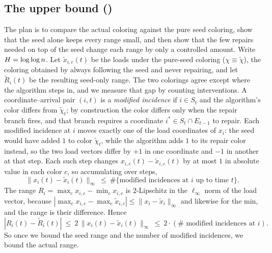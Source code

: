 \subsection{The upper bound ()}\label{app:online-upper-full}

The plan is to compare the actual coloring against the pure seed coloring, show that the seed alone keeps every range small,
and then show that the few repairs needed on top of the seed change each range by only a controlled amount. Write
$H=\log\log n$. Let $\widetilde x_{i,c}(t)$ be the loads under the pure-seed coloring ($\chi\equiv\widetilde\chi$), the
coloring obtained by always following the seed and never repairing, and let $\widetilde R_i(t)$ be the resulting seed-only
range. The two colorings agree except where the algorithm steps in, and we measure that gap by counting interventions. A
coordinate--arrival pair $(i,t)$ is a \emph{modified incidence} if $i\in S_t$ and the algorithm's color differs from
$\widetilde\chi_t$; by construction the color differs only when the repair branch fires, and that branch requires a
coordinate $i^*\in S_t\cap E_{t-1}$ to repair. Each modified incidence at $i$ moves exactly one of the load coordinates of
$x_i$: the seed would have added $1$ to color $\widetilde\chi_t$, while the algorithm adds $1$ to its repair color instead,
so the two load vectors differ by $+1$ in one coordinate and $-1$ in another at that step. Each such step changes
$x_{i,c}(t)-\widetilde x_{i,c}(t)$ by at most $1$ in absolute value in each color $c$, so accumulating over steps,
\[
  \|x_i(t)-\widetilde x_i(t)\|_\infty\ \le\ \#\{\text{modified incidences at }i\text{ up to time }t\}.
\]
The range $R_i=\max_c x_{i,c}-\min_c x_{i,c}$ is $2$-Lipschitz in the $\ell_\infty$ norm of the load vector, because
$|\max_c x_{i,c}-\max_c\widetilde x_{i,c}|\le\|x_i-\widetilde x_i\|_\infty$ and likewise for the min, and the range is their
difference. Hence
\[
  |R_i(t)-\widetilde R_i(t)|\ \le\ 2\,\|x_i(t)-\widetilde x_i(t)\|_\infty\ \le\ 2\cdot(\#\text{ modified incidences at }i).
\]
So once we bound the seed range and the number of modified incidences, we bound the actual range.

